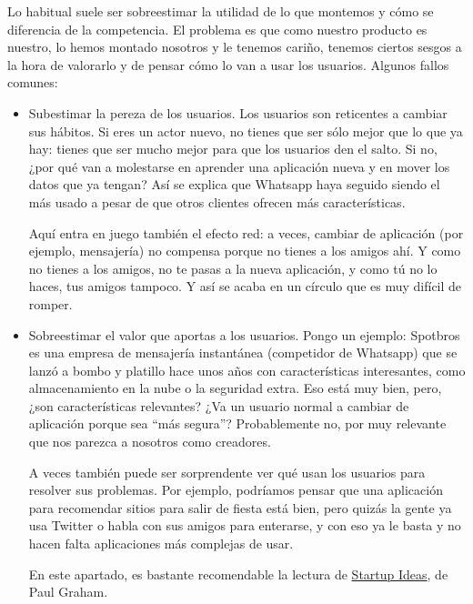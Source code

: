 \documentclass[nochap,palatino,shortheader]{apuntes}
\newcommand{\study}[1]{#1} \newcommand{\substudy}[1]{#1}
\begin{document}
Lo habitual suele ser sobreestimar la utilidad de lo que montemos y cómo se diferencia de la competencia. El problema es que como nuestro producto es nuestro, lo hemos montado nosotros y le tenemos cariño, tenemos ciertos sesgos a la hora de valorarlo y de pensar cómo lo van a usar los usuarios. Algunos fallos comunes:

\begin{itemize}
\item
\study{Subestimar la pereza de los usuarios.}
Los usuarios son reticentes a cambiar sus hábitos. Si eres un actor nuevo, no tienes que ser sólo mejor que lo que ya hay: tienes que ser mucho mejor para que los usuarios den el salto. Si no, ¿por qué van a molestarse en aprender una aplicación nueva y en mover los datos que ya tengan? Así se explica que \substudy{Whatsapp} haya seguido siendo el más usado a pesar de que otros clientes ofrecen más características.

Aquí entra en juego también el efecto red: a veces, cambiar de aplicación (por ejemplo, mensajería) no compensa porque no tienes a los amigos ahí. Y como no tienes a los amigos, no te pasas a la nueva aplicación, y como tú no lo haces, tus amigos tampoco. Y así se acaba en un círculo que es muy difícil de romper.

\item
\study{Sobreestimar el valor que aportas a los usuarios.}
Pongo un ejemplo: Spotbros es una empresa de mensajería instantánea (competidor de \substudy{Whatsapp}) que se lanzó a bombo y platillo hace unos años con características interesantes, como almacenamiento en la nube o la seguridad extra. Eso está muy bien, pero, ¿son características relevantes? ¿Va un usuario normal a cambiar de aplicación porque sea ``más segura''? Probablemente no, por muy relevante que nos parezca a nosotros como creadores.

A veces también puede ser sorprendente ver qué usan los usuarios para resolver sus problemas. Por ejemplo, podríamos pensar que una aplicación para recomendar sitios para salir de fiesta está bien, pero quizás la gente ya usa Twitter o habla con sus amigos para enterarse, y con eso ya le basta y no hacen falta aplicaciones más complejas de usar.

En este apartado, es bastante recomendable la lectura de \href{http://paulgraham.com/startupideas.html}{Startup Ideas}, de Paul Graham.


\end{itemize}
\end{document}
